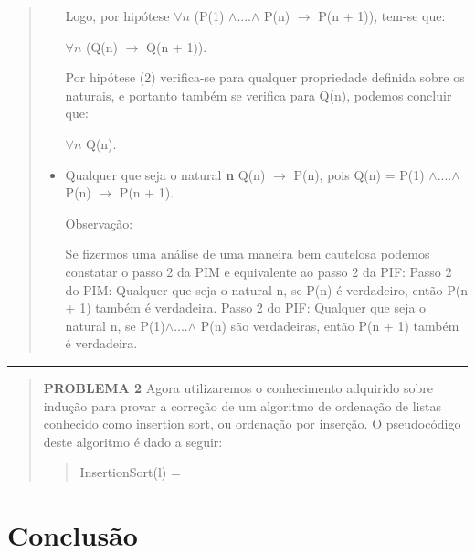 \documentclass[a4paper, 10pt]{article}
\begin{document}
\begin{quote}
\begin{itemize}
                   Logo, por hipótese $\forall n  $ (P(1) $\wedge$....$\wedge$ P(n) $\to$ P(n + 1)), tem-se que:
                   
                   $\forall n $ (Q(n) $\to$ Q(n + 1)).
                   
                   Por hipótese (2) verifica-se para qualquer propriedade definida sobre os naturais, e portanto também se verifica para Q(n), podemos concluir que:
                   
                   $\forall n $ Q(n).
                   \item Qualquer que seja o natural \textbf{n} Q(n) $\to$ P(n), pois Q(n) = P(1) $\wedge$....$\wedge$ P(n) $\to$ P(n + 1).
                   
                   Observação:
                   
                   Se fizermos uma análise de uma maneira bem cautelosa podemos constatar o passo 2 da PIM e equivalente ao passo 2 da PIF:
                   \newline
                   Passo 2 do PIM: Qualquer que seja o natural n, se P(n) é verdadeiro, então P(n + 1) também é verdadeira.
                   \newline
                   Passo 2 do PIF: Qualquer que seja o natural n, se P(1)$\wedge$....$\wedge$ P(n) são verdadeiras, então P(n + 1) também é verdadeira.
         
            \end{itemize}
    \end{quote}
    \hrule
  
    \begin{quote}
     
        \textbf{PROBLEMA 2}
        Agora utilizaremos o conhecimento adquirido sobre indução para provar a correção de um algoritmo de ordenação de listas conhecido como insertion sort, ou ordenação por inserção.
O pseudocódigo deste algoritmo é dado a seguir:
\begin{quote}
    InsertionSort(l) = 
\end{quote}
    \end{quote}


\section{Conclusão}
\end{document}
